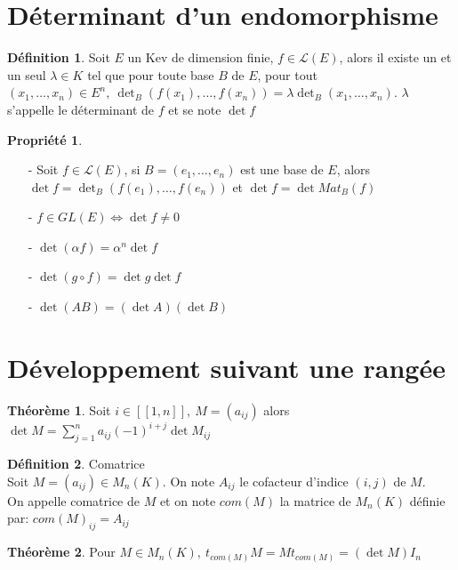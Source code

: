 \documentclass[fleqn]{article}
\theoremstyle{definition} \newtheorem*{defi}{D\'efinition}
\theoremstyle{definition} \newtheorem*{theo}{Th\'eor\`eme}
\theoremstyle{definition} \newtheorem*{coro}{Corollaire}
\theoremstyle{definition} \newtheorem*{nota}{Notation}
\theoremstyle{definition} \newtheorem*{vocab}{Vocabulaire}
\theoremstyle{remark} \newtheorem*{rqs}{Remarques}
\theoremstyle{definition} \newtheorem*{prop}{Propri\'et\'e}
\begin{document}
\section{D\'eterminant d'un endomorphisme}
\begin{defi}
	Soit $E$ un Kev de dimension finie, $f \in \mathscr{L}(E)$, alors il existe un et un seul $\lambda \in K$ tel que pour toute base $B$ de $E$,
	pour tout $(x_1, \hdots, x_n) \in E^n,\ \det_B(f(x_1), \hdots, f(x_n)) = \lambda \det_B(x_1, \hdots, x_n)$. $\lambda$ s'appelle le
	d\'eterminant de $f$ et se note $\det f$
\end{defi}

\begin{prop} $ $
	\begin{enumerate}
		\item [-] Soit $f \in \mathscr{L}(E)$, si $B = (e_1, \hdots, e_n)$ est une base de $E$, alors $\det f = \det_B (f(e_1), \hdots, f(e_n))$
			et $\det f = \det Mat_B (f)$
		\item [-] $f \in GL(E) \Leftrightarrow \det f \neq 0$
		\item [-] $\det (\alpha f) = \alpha^n \det f$
		\item [-] $\det (g \circ f) = \det g \det f$
		\item [-] $\det (AB) = (\det A) (\det B)$
	\end{enumerate}
\end{prop}

\section{D\'eveloppement suivant une rang\'ee}
\begin{theo}
	Soit $i \in [\![1,n]\!],\ M = (a_{ij})$ alors $\det M = \sum_{j=1}^n a_{ij}(-1)^{i+j} \det M_{ij}$
\end{theo}

\begin{defi} Comatrice \\
	Soit $M = (a_{ij}) \in M_n(K)$. On note $A_{ij}$ le cofacteur d'indice $(i,j)$ de $M$. \\
	On appelle comatrice de $M$ et on note $com(M)$ la matrice de $M_n(K)$ d\'efinie par: $com(M)_{ij} = A_{ij}$
\end{defi}

\begin{theo} Pour $M \in M_n(K),\ t_{com(M)} M = M t_{com(M)} = (\det M) I_n$

\end{theo}
\end{document}
